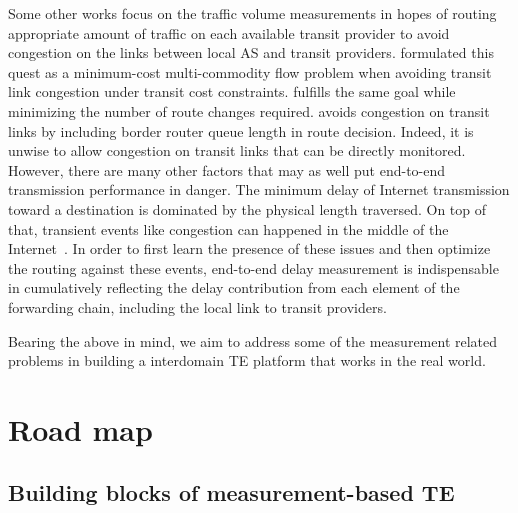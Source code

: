 Some other works focus on the traffic volume measurements in hopes of routing appropriate amount of traffic on each available transit provider to avoid congestion on the links between local AS and transit providers.
\cite{Goldenberg2004} formulated this quest as a minimum-cost multi-commodity flow problem when avoiding transit link congestion under transit cost constraints.
\cite{Uhlig2004b} fulfills the same goal while minimizing the number of route changes required.
\cite{Zhu2014} avoids congestion on transit links by including border router queue length in route decision.
Indeed, it is unwise to allow congestion on transit links that can be directly monitored.
However, there are many other factors that may as well put end-to-end transmission performance in danger.
The minimum delay of Internet transmission toward a destination is dominated by the physical length traversed. 
On top of that, transient events like congestion can happened in the middle of the Internet~\cite{Akella2003, Luckie2014}.
In order to first learn the presence of these issues and then optimize the routing against these events, end-to-end delay measurement is indispensable in cumulatively reflecting the delay contribution from each element of the forwarding chain, including the local link to transit providers.

Bearing the above in mind, we aim to address some of the measurement related problems in building a interdomain TE platform that works in the real world.


\section{Road map}
\subsection{Building blocks of measurement-based TE}

